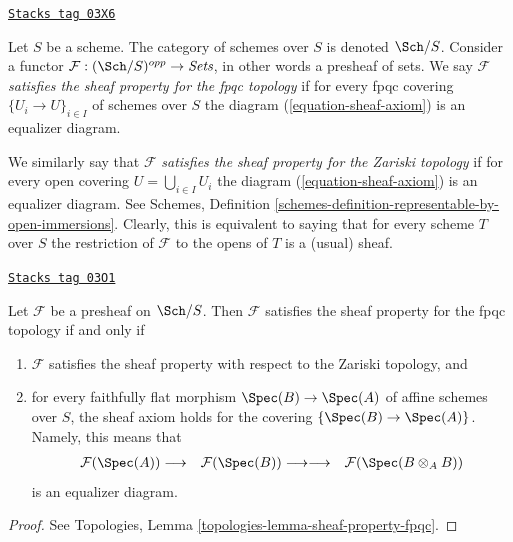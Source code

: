 \begin{definition}
\label{etale-cohomology-definition-sheaf-property-fpqc}
\href{https://stacks.math.columbia.edu/tag/03X6}{\texttt{Stacks tag 03X6}}

Let $S$ be a scheme. The category of schemes over $S$ is denoted
$\Sch/S$. Consider a functor
$\mathcal{F} : (\Sch/S)^{opp} \to \textit{Sets}$, in other words
a presheaf of sets. We say $\mathcal{F}$
{\it satisfies the sheaf property for the fpqc topology}
if for every fpqc covering $\{U_i \to U\}_{i \in I}$ of schemes over $S$
the diagram (\ref{equation-sheaf-axiom}) is an equalizer diagram.
\end{definition}

We similarly say that $\mathcal{F}$
{\it satisfies the sheaf property for the Zariski topology} if for
every open covering $U = \bigcup_{i \in I} U_i$ the diagram
(\ref{equation-sheaf-axiom}) is an equalizer diagram. See
Schemes, Definition \ref{schemes-definition-representable-by-open-immersions}.
Clearly, this is equivalent to saying that for every scheme $T$ over $S$ the
restriction of $\mathcal{F}$ to the opens of $T$ is a (usual) sheaf.

\begin{lemma}
\label{etale-cohomology-lemma-fpqc-sheaves}
\href{https://stacks.math.columbia.edu/tag/03O1}{\texttt{Stacks tag 03O1}}

Let $\mathcal{F}$ be a presheaf on $\Sch/S$. Then
$\mathcal{F}$ satisfies the sheaf property for the fpqc topology
if and only if
\begin{enumerate}
\item $\mathcal{F}$ satisfies the sheaf property with respect to the
Zariski topology, and
\item for every faithfully flat morphism $\Spec(B) \to \Spec(A)$
of affine schemes over $S$, the sheaf axiom holds for the covering
$\{\Spec(B) \to \Spec(A)\}$. Namely, this means that
$$
\begin{array}{ccc}\mathcal{F}(\Spec(A)) \longrightarrow & \mathcal{F}(\Spec(B)) \longrightarrow\longrightarrow & \mathcal{F}(\Spec(B \otimes_A B))\end{array}
$$
is an equalizer diagram.
\end{enumerate}
\end{lemma}

\begin{proof}
See Topologies, Lemma \ref{topologies-lemma-sheaf-property-fpqc}.
\end{proof}

